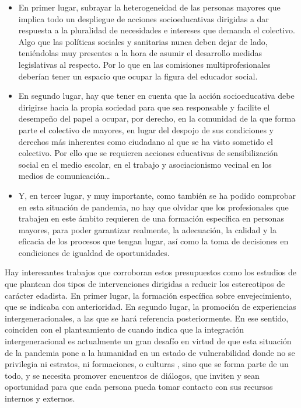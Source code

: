 \documentclass{textolivre}
\begin{document}
\begin{itemize}
    \item En primer lugar, subrayar la heterogeneidad de las personas mayores que implica todo un despliegue de acciones socioeducativas dirigidas a dar respuesta a la pluralidad de necesidades e intereses que demanda el colectivo. Algo que las políticas sociales y sanitarias nunca deben dejar de lado, teniéndolas muy presentes a la hora de asumir el desarrollo medidas legislativas al respecto. Por lo que en las comisiones multiprofesionales deberían tener un espacio que ocupar la figura del educador social.
    \item En segundo lugar, hay que tener en cuenta que la acción socioeducativa debe dirigirse hacia la propia sociedad para que sea responsable y facilite el desempeño del papel a ocupar, por derecho, en la comunidad de la que forma parte el colectivo de mayores, en lugar del despojo de sus condiciones y derechos más inherentes como ciudadano al que se ha visto sometido el colectivo. Por ello que se requieren acciones educativas de sensibilización social en el medio escolar, en el trabajo y asociacionismo vecinal en los medios de comunicación…
    \item Y, en tercer lugar, y muy importante, como también se ha podido comprobar en esta situación de pandemia, no hay que olvidar que los profesionales que trabajen en este ámbito requieren de una formación específica en personas mayores, para poder garantizar realmente, la adecuación, la calidad y la eficacia de los procesos que tengan lugar, así como la toma de decisiones en condiciones de igualdad de oportunidades.
\end{itemize}

Hay interesantes trabajos que corroboran estos presupuestos como los estudios de \textcite{lorentem2020} %
que plantean dos tipos de intervenciones dirigidas a reducir los estereotipos de carácter edadista. En primer lugar, la formación específica sobre envejecimiento, que se indicaba con anterioridad. En segundo lugar, la promoción de experiencias intergeneracionales, a las que se hará referencia posteriormente. En ese sentido, coinciden con el planteamiento de \textcite{lopezdoblas2020} %
cuando indica que la integración intergeneracional es actualmente un gran desafío en virtud de que esta situación de la pandemia pone a la humanidad en un estado de vulnerabilidad donde no se privilegia ni estratos, ni formaciones, o culturas \cite{moral2017}, %
sino que se forma parte de un todo, y se necesita promover encuentros de diálogos, que inviten y sean oportunidad para que cada persona pueda tomar contacto con sus recursos internos y externos.
\end{document}
